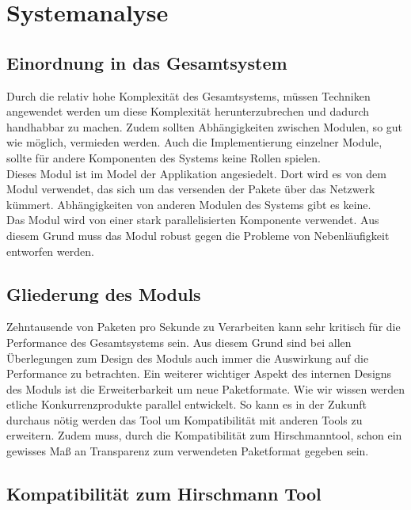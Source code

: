 \section{Systemanalyse}

\subsection{Einordnung in das Gesamtsystem}


Durch die relativ hohe Komplexität des Gesamtsystems, müssen Techniken angewendet werden um diese Komplexität herunterzubrechen und dadurch handhabbar zu machen. Zudem sollten Abhängigkeiten zwischen Modulen, so gut wie möglich, vermieden werden. Auch die 
Implementierung einzelner Module, sollte für andere Komponenten des Systems keine Rollen spielen.
\\
Dieses Modul ist im Model der Applikation angesiedelt.
Dort wird es von dem Modul verwendet, das sich um das versenden der Pakete über das Netzwerk kümmert.
Abhängigkeiten von anderen Modulen des Systems gibt es keine.
\\
Das Modul wird von einer stark parallelisierten Komponente verwendet. Aus diesem Grund muss das Modul robust gegen die Probleme von Nebenläufigkeit entworfen werden.

\subsection{Gliederung des Moduls}
\label{sec:7:speed}
Zehntausende von Paketen pro Sekunde zu Verarbeiten kann sehr kritisch für die Performance des Gesamtsystems sein.
Aus diesem Grund sind bei allen Überlegungen zum Design des Moduls auch immer die Auswirkung auf die Performance zu betrachten.
Ein weiterer wichtiger Aspekt des internen Designs des Moduls ist die Erweiterbarkeit um neue Paketformate.
Wie wir wissen werden etliche Konkurrenzprodukte parallel entwickelt. So kann es in der Zukunft durchaus nötig
werden das Tool um Kompatibilität mit anderen Tools zu erweitern. Zudem muss, durch die Kompatibilität zum Hirschmanntool, schon
ein gewisses Maß an Transparenz zum verwendeten Paketformat gegeben sein.

\subsection{Kompatibilität zum Hirschmann Tool}
\label{sec:7:comaptability}

